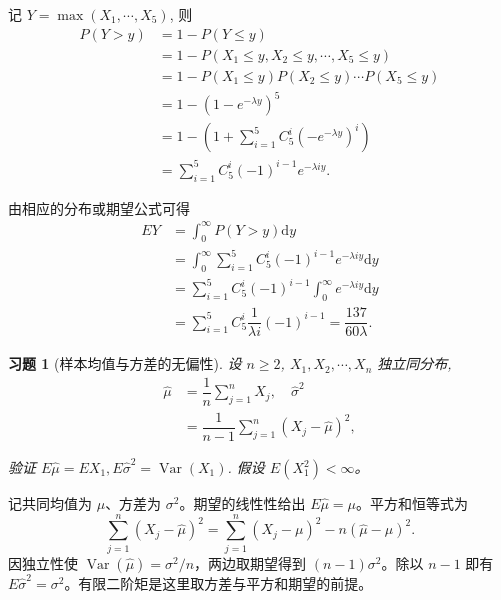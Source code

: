 \documentclass[UTF8,12pt,a4paper,fontset=fandol]{ctexart}
\newtheorem{exercise}{习题}[section]
\begin{document}
\begin{solve}\label{a:A5.17}
    记 $Y=\max(X_1,\cdots,X_5)$, 则
    \begin{align*}
        P(Y>y) & =1-P(Y\leq y) \\
        & =1-P(X_1\leq y,X_2\leq y,\cdots,X_5\leq y) \\
        & =1-P(X_1\leq y)P(X_2\leq y)\cdots P(X_5\leq y) \\
        & =1-(1-e^{-\lambda y})^5 \\
        & =1-\left(1+\sum\limits_{i=1}^5C_5^i(-e^{-\lambda y})^i\right) \\
        & =\sum\limits_{i=1}^5C_5^i(-1)^{i-1}e^{-\lambda iy}.
    \end{align*}

    由相应的分布或期望公式可得
    \begin{align*}
        EY & =\int_0^\infty P(Y>y)\mathrm{d}y \\
        & =\int_0^\infty\sum\limits_{i=1}^5C_5^i(-1)^{i-1}e^{-\lambda iy}\mathrm{d}y \\
        & =\sum\limits_{i=1}^5C_5^i(-1)^{i-1}\int_0^\infty e^{-\lambda iy}\mathrm{d}y \\
        & =\sum\limits_{i=1}^5C_5^i\dfrac{1}{\lambda i}(-1)^{i-1}=\dfrac{137}{60\lambda}.
    \end{align*}
\end{solve}

\begin{exercise}[样本均值与方差的无偏性]\label{q:A5.20}
设 $n\geq 2$, $X_1,X_2,\cdots,X_n$ 独立同分布,
    \[\begin{aligned}\hat{\mu}&=\dfrac{1}{n}\sum\limits_{j=1}^nX_j,\quad\hat{\sigma}^2\\&=\dfrac{1}{n-1}\sum\limits_{j=1}^n(X_j-\hat{\mu})^2,\end{aligned}\]

    验证 $E\hat{\mu}=EX_1,E\hat{\sigma}^2=\operatorname{Var}(X_1)$. 假设 $E(X_1^2)<\infty$。\par{}
\end{exercise}

\begin{solve}\label{a:A5.20}记共同均值为 $\mu$、方差为 $\sigma^2$。期望的线性性给出 $E\widehat\mu=\mu$。平方和恒等式为\[\sum_{j=1}^n(X_j-\widehat\mu)^2=\sum_{j=1}^n(X_j-\mu)^2-n(\widehat\mu-\mu)^2.\]因独立性使 $\operatorname{Var}(\widehat\mu)=\sigma^2/n$，两边取期望得到 $(n-1)\sigma^2$。除以 $n-1$ 即有 $E\widehat\sigma^2=\sigma^2$。有限二阶矩是这里取方差与平方和期望的前提。\end{solve}
\end{document}
